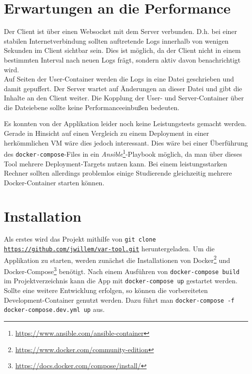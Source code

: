 \section{Erwartungen an die Performance}
Der Client ist über einen Websocket mit dem Server verbunden.
D.h. bei einer stabilen Internetverbindung sollten auftretende Logs innerhalb von wenigen Sekunden im Client sichtbar sein.
Dies ist möglich, da der Client nicht in einem bestimmten Interval nach neuen Logs frägt, sondern aktiv davon benachrichtigt wird.
\\
Auf Seiten der User-Container werden die Logs in eine Datei geschrieben und damit gepuffert.
Der Server wartet auf Änderungen an dieser Datei und gibt die Inhalte an den Client weiter.
Die Kopplung der User- und Server-Container über die Dateiebene sollte keine Performanceeinbußen bedeuten.
\par
Es konnten von der Applikation leider noch keine Leistungstests gemacht werden.
Gerade in Hinsicht auf einen Vergleich zu einem Deployment in einer herkömmlichen \ac{VM} wäre dies jedoch interessant.
Dies wäre bei einer Überführung des \texttt{docker-compose}-Files in ein \textit{Ansible}\footnote{\url{https://www.ansible.com/ansible-container}}-Playbook möglich, da man über dieses Tool mehrere Deployment-Targets nutzen kann.
Bei einem leistungsstarken Rechner sollten allerdings problemlos einige Studierende gleichzeitig mehrere Docker-Container starten können.
\section{Installation}
Als erstes wird das Projekt mithilfe von \texttt{git clone \url{https://github.com/jwillem/var-tool.git}} heruntergeladen.
Um die Applikation zu starten, werden zunächst die Installationen von Docker\footnote{\url{https://www.docker.com/community-edition}} und Docker-Compose\footnote{\url{https://docs.docker.com/compose/install/}} benötigt.
Nach einem Ausführen von \texttt{docker-compose build} im Projektverzeichnis kann die App mit \texttt{docker-compose up} gestartet werden.
\\
Sollte eine weitere Entwicklung erfolgen, so können die vorbereiteten Development-Container genutzt werden.
Dazu führt man \texttt{docker-compose -f docker-compose\break .dev.yml up} aus.
